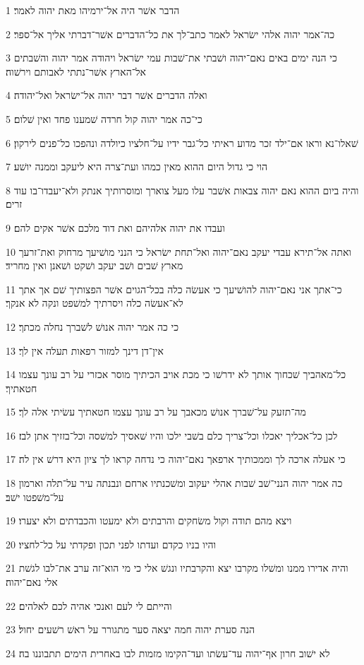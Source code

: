 \par 1 הדבר אשׁר היה אל־ירמיהו מאת יהוה לאמר׃
\par 2 כה־אמר יהוה אלהי ישׂראל לאמר כתב־לך את כל־הדברים אשׁר־דברתי אליך אל־ספר׃
\par 3 כי הנה ימים באים נאם־יהוה ושׁבתי את־שׁבות עמי ישׂראל ויהודה אמר יהוה והשׁבתים אל־הארץ אשׁר־נתתי לאבותם וירשׁוה׃
\par 4 ואלה הדברים אשׁר דבר יהוה אל־ישׂראל ואל־יהודה׃
\par 5 כי־כה אמר יהוה קול חרדה שׁמענו פחד ואין שׁלום׃
\par 6 שׁאלו־נא וראו אם־ילד זכר מדוע ראיתי כל־גבר ידיו על־חלציו כיולדה ונהפכו כל־פנים לירקון׃
\par 7 הוי כי גדול היום ההוא מאין כמהו ועת־צרה היא ליעקב וממנה יושׁע׃
\par 8 והיה ביום ההוא נאם יהוה צבאות אשׁבר עלו מעל צוארך ומוסרותיך אנתק ולא־יעבדו־בו עוד זרים׃
\par 9 ועבדו את יהוה אלהיהם ואת דוד מלכם אשׁר אקים להם׃
\par 10 ואתה אל־תירא עבדי יעקב נאם־יהוה ואל־תחת ישׂראל כי הנני מושׁיעך מרחוק ואת־זרעך מארץ שׁבים ושׁב יעקב ושׁקט ושׁאנן ואין מחריד׃
\par 11 כי־אתך אני נאם־יהוה להושׁיעך כי אעשׂה כלה בכל־הגוים אשׁר הפצותיך שׁם אך אתך לא־אעשׂה כלה ויסרתיך למשׁפט ונקה לא אנקך׃
\par 12 כי כה אמר יהוה אנושׁ לשׁברך נחלה מכתך׃
\par 13 אין־דן דינך למזור רפאות תעלה אין לך׃
\par 14 כל־מאהביך שׁכחוך אותך לא ידרשׁו כי מכת אויב הכיתיך מוסר אכזרי על רב עונך עצמו חטאתיך׃
\par 15 מה־תזעק על־שׁברך אנושׁ מכאבך על רב עונך עצמו חטאתיך עשׂיתי אלה לך׃
\par 16 לכן כל־אכליך יאכלו וכל־צריך כלם בשׁבי ילכו והיו שׁאסיך למשׁסה וכל־בזזיך אתן לבז׃
\par 17 כי אעלה ארכה לך וממכותיך ארפאך נאם־יהוה כי נדחה קראו לך ציון היא דרשׁ אין לה׃
\par 18 כה אמר יהוה הנני־שׁב שׁבות אהלי יעקוב ומשׁכנתיו ארחם ונבנתה עיר על־תלה וארמון על־משׁפטו ישׁב׃
\par 19 ויצא מהם תודה וקול משׂחקים והרבתים ולא ימעטו והכבדתים ולא יצערו׃
\par 20 והיו בניו כקדם ועדתו לפני תכון ופקדתי על כל־לחציו׃
\par 21 והיה אדירו ממנו ומשׁלו מקרבו יצא והקרבתיו ונגשׁ אלי כי מי הוא־זה ערב את־לבו לגשׁת אלי נאם־יהוה׃
\par 22 והייתם לי לעם ואנכי אהיה לכם לאלהים׃
\par 23 הנה סערת יהוה חמה יצאה סער מתגורר על ראשׁ רשׁעים יחול׃
\par 24 לא ישׁוב חרון אף־יהוה עד־עשׂתו ועד־הקימו מזמות לבו באחרית הימים תתבוננו בה׃

